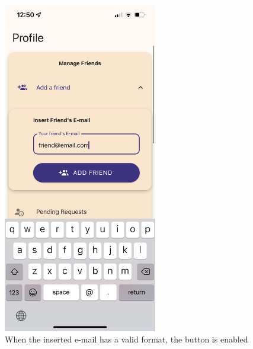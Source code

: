 \documentclass[12pt]{article}
\begin{document}
\begin{figure}[h!]
\begin{minipage}[c]{0.45\textwidth}
        \includegraphics[width=0.6\textwidth, clip]{../../assets/smartphone/profileAddEmail.PNG}
        \caption{When the inserted e-mail has a valid format, the button is enabled}
        \label{fig:profileAddEmail}
    \end{minipage}
\end{figure}
\end{document}
